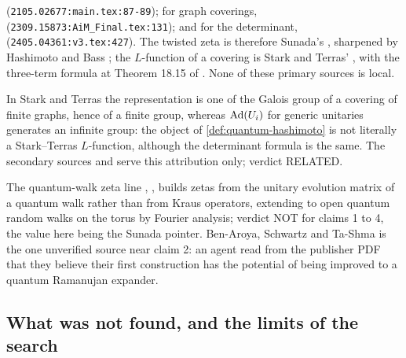 \begin{citedfact}
\label{cit:sunada-attribution}
\sloppy
{\small\texttt{}}
(\texttt{2105.02677:main.tex:87-89}); for graph coverings,
{\small\texttt{}}
(\texttt{2309.15873:AiM\_Final.tex:131}); and for the determinant,
{\small\texttt{}}
(\texttt{2405.04361:v3.tex:427}). The twisted zeta is therefore Sunada's
\cite{sunada1986lfunctions}, sharpened by Hashimoto \cite{hashimoto1989zeta}
and Bass \cite{bass1992ihara}; the $L$-function of a covering is Stark and
Terras' \cite{stark1996zeta}, with the three-term formula at Theorem 18.15 of
\cite{terras2010zeta}. None of these primary sources is local.
\end{citedfact}

In Stark and Terras the representation is one of the Galois group of a
covering of finite graphs, hence of a finite group, whereas $\operatorname{Ad}(U_{i})$ for
generic unitaries generates an infinite group: the object of
\cref{def:quantum-hashimoto} is not literally a Stark--Terras $L$-function,
although the determinant formula is the same. The secondary sources
\cite{eyler2023artin} and \cite{ghosh2024iwasawa} serve this attribution
only; verdict RELATED.

The quantum-walk zeta line \cite{konno2012zeta}, \cite{komatsu2021walkzeta},
\cite{komatsu2021scattering} builds zetas from the unitary evolution matrix of
a quantum walk rather than from Kraus operators, \cite{komatsu2021walkzeta}
extending to open quantum random walks on the torus by Fourier analysis;
verdict NOT for claims 1 to 4, the value here being the Sunada pointer. Ben-Aroya, Schwartz and Ta-Shma
\cite{benaroya2010quantum} is the one unverified source near claim 2: an
agent read from the publisher PDF that they believe their first construction
has the potential of being improved to a quantum Ramanujan expander.

\subsection{What was not found, and the limits of the search}

